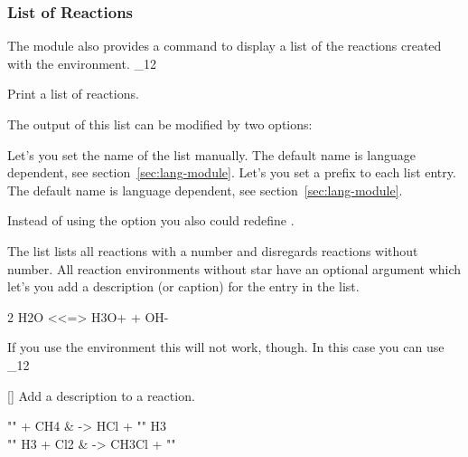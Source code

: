 \documentclass[load-preamble+]{cnltx-doc}
\makeatletter
\def\chemmodule*#1{\textquotedblleft#1\textquotedblright}%
\renewenvironment{commands}
  {%
    \cnltx@set@catcode_{12}%
    \let\command\cnltx@command
    \cnltxlist
  }
  {\endcnltxlist}
\makeatother
\begin{document}
\subsubsection{List of Reactions}

The  module also provides a command to display a list of
the reactions created with the  environment.
\begin{commands}
  \command{listofreactions}
    Print a list of reactions.
\end{commands}
\begin{example}
  \listofreactions
\end{example}

The output of this list can be modified by two options:
\begin{options}
    Let's you set the name of the list manually.  The default name is language
    dependent, see section~\vref{sec:lang-module}.
    Let's you set a prefix to each list entry.  The default name is language
    dependent, see section~\vref{sec:lang-module}.
\end{options}
Instead of using the option  you also could redefine
.

The list lists all reactions with a number and disregards reactions without
number.  All reaction environments without star have an optional argument
which let's you add a description (or caption) for the entry in the list.
\begin{example}
  \begin{reaction}[Autoprotolyse]
    2 H2O <<=> H3O+ + OH-
  \end{reaction}
\end{example}

If you use the  environment this will not work, though.  In
this case you can use
\begin{commands}
  \command{AddRxnDesc}[]
    Add a description to a reaction.
\end{commands}

\begin{example}
  \begin{reactions}
    "" + CH4  &
      -> HCl + "" H3  \\
    "" H3 + Cl2 &
      -> CH3Cl + "" 
  \end{reactions}
\end{example}
\end{document}
